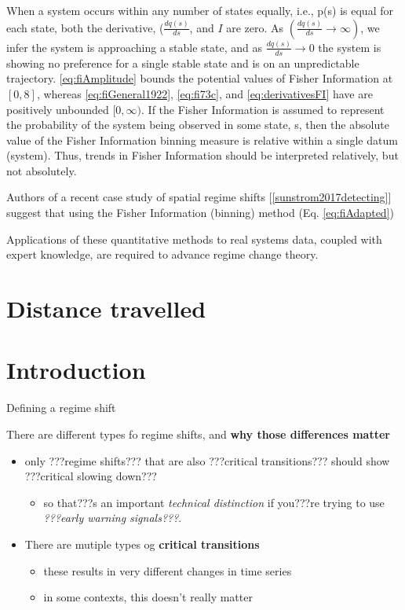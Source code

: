 \documentclass[12pt,twoside,openany]{reedthesis}
\providecommand{\tightlist}{%
  \setlength{\itemsep}{0pt}\setlength{\parskip}{0pt}}
\begin{document}
When a system occurs within any number of states equally, i.e., p(s) is
equal for each state, both the derivative, (\(\frac{dq(s)}{ds}\), and
\(I\) are zero. As \((\frac{dq(s)}{ds} \rightarrow \infty)\), we infer
the system is approaching a stable state, and as
\(\frac{dq(s)}{ds} \rightarrow 0\) the system is showing no preference
for a single stable state and is on an unpredictable trajectory.
\eqref{eq:fiAmplitude} bounds the potential values of Fisher Information
at \([0, 8]\), whereas \eqref{eq:fiGeneral1922}, \eqref{eq:fi73c}, and
\eqref{eq:derivativesFI} have are positively unbounded \([0, \infty)\). If
the Fisher Information is assumed to represent the probability of the
system being observed in some state, s, then the absolute value of the
Fisher Information binning measure is relative within a single datum
(system). Thus, trends in Fisher Information should be interpreted
relatively, but not absolutely.

Authors of a recent case study of spatial regime shifts
{[}\ref{sunstrom2017detecting}{]} suggest that using the Fisher
Information (binning) method (Eq. \eqref{eq:fiAdapted})

Applications of these quantitative methods to real systems data, coupled
with expert knowledge, are required to advance regime change theory.

\chapter{Distance travelled}\label{distance-chapter}

\chapter{Introduction}\label{introduction-3}

Defining a regime shift

There are different types fo regime shifts, and \textbf{why those
differences matter}
\begin{itemize}
\tightlist
\item
  only ???regime shifts??? that are also ???critical transitions???
  should show ???critical slowing down???
  \begin{itemize}
  \tightlist
  \item
    so that???s an important \emph{technical distinction} if you???re
    trying to use \emph{???early warning signals???}.\\
  \end{itemize}
\item
  There are mutiple types og \textbf{critical transitions}
  \begin{itemize}
  \tightlist
  \item
    these results in very different changes in time series\\
  \item
    in some contexts, this doesn't really matter
  \end{itemize}
\end{itemize}
\end{document}
